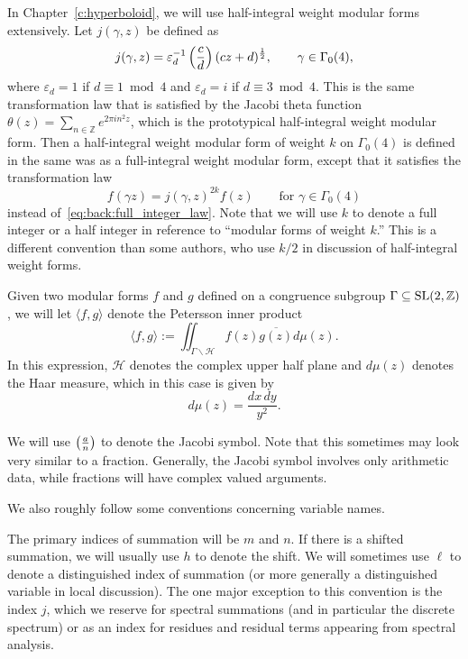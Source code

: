 In Chapter~\ref{c:hyperboloid}, we will use half-integral weight modular forms
extensively.
Let $j(\gamma, z)$ be defined as
\begin{equation}
  j(\gamma, z) = \varepsilon_d^{-1} \left(\frac{c}{d}\right) (cz + d)^{\frac{1}{2}}, \qquad \gamma \in
  \Gamma_0(4),
\end{equation}
where $\varepsilon_d = 1$ if $d \equiv 1 \bmod 4$ and $\varepsilon_d = i$ if $d \equiv 3
\bmod 4$.
This is the same transformation law that is satisfied by the Jacobi theta function
$\theta(z) = \sum_{n \in \mathbb{Z}} e^{2\pi i n^2 z}$, which is the prototypical
half-integral weight modular form.
Then a half-integral weight modular form of weight $k$ on $\Gamma_0(4)$ is defined in the
same was as a full-integral weight modular form, except that it satisfies the
transformation law
\begin{equation}
  f(\gamma z) = j(\gamma, z)^{2k} f(z) \qquad \text{for } \gamma \in \Gamma_0(4)
\end{equation}
instead of~\eqref{eq:back:full_integer_law}.
Note that we will use $k$ to denote a full integer or a half integer in reference to
``modular forms of weight $k$.''
This is a different convention than some authors, who use $k/2$ in discussion of
half-integral weight forms.


Given two modular forms $f$ and $g$ defined on a congruence subgroup $\Gamma \subseteq
\operatorname{SL}(2, \mathbb{Z})$, we will let $\langle f, g \rangle$ denote the Petersson inner
product
\begin{equation}
  \langle f, g \rangle := \iint_{\Gamma \backslash \mathcal{H}} f(z) \overline{g(z)}
  d\mu(z).
\end{equation}
In this expression, $\mathcal{H}$ denotes the complex upper half plane and $d\mu(z)$
denotes the Haar measure, which in this case is given by
\begin{equation}
  d\mu(z) = \frac{dx\, dy}{y^2}.
\end{equation}


We will use $\left(\frac{a}{n}\right)$ to denote the Jacobi symbol.
Note that this sometimes may look very similar to a fraction.
Generally, the Jacobi symbol involves only arithmetic data, while fractions will have
complex valued arguments.


We also roughly follow some conventions concerning variable names.


The primary indices of summation will be $m$ and $n$.
If there is a shifted summation, we will usually use $h$ to denote the shift.
We will sometimes use $\ell$ to denote a distinguished index of summation (or more
generally a distinguished variable in local discussion).
The one major exception to this convention is the index $j$, which we reserve for spectral
summations (and in particular the discrete spectrum) or as an index for residues and
residual terms appearing from spectral analysis.


